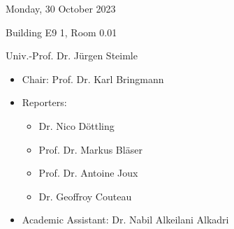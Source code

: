 
 Monday, 30 October 2023

 Building E9 1, Room 0.01

 Univ.-Prof. Dr. J\"urgen Steimle

\begin{itemize}
    \item Chair:  Prof. Dr. Karl Bringmann
    \item Reporters: \begin{itemize}
        \item Dr. Nico D\"ottling
        \item Prof. Dr. Markus Bl\"aser
        \item Prof. Dr. Antoine Joux
        \item Dr. Geoffroy Couteau
    \end{itemize}
    \item Academic Assistant: Dr. Nabil Alkeilani Alkadri
\end{itemize}


